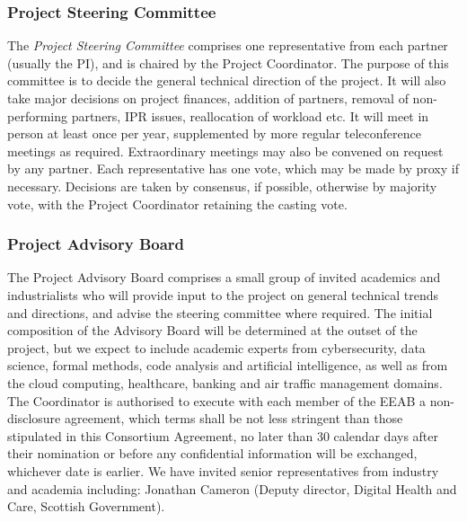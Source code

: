\documentclass[a4paper,11pt]{article}
\begin{document}
\subsubsection*{Project Steering Committee}
\vspace{-5pt}

The \emph{Project Steering Committee} comprises one representative from each partner
(usually the PI), and is chaired by the Project Coordinator.  
The purpose of this committee is to decide
the general technical direction of the project.  It will also
take major decisions on project finances, addition of partners, removal of non-performing
partners, IPR issues, reallocation of workload etc.  It will meet in person
at least once per year, supplemented by more regular teleconference
meetings as required. Extraordinary meetings may also be convened on request by any partner.
Each representative has one vote, which
may be made by proxy if necessary.  Decisions are taken by
consensus, if possible, otherwise by majority vote, with the
Project Coordinator retaining the casting vote.

\subsubsection*{Project Advisory Board}
\vspace{-5pt}

The Project Advisory Board comprises a small group of invited
academics and industrialists who will provide input to the
project on general technical trends and directions, and advise
the steering committee where required.  The initial composition
of the Advisory Board will be determined at the outset of the
project, but we expect to include academic experts from cybersecurity, data science, formal methods, code analysis and artificial intelligence, as well as from the cloud computing, healthcare, banking and air traffic management domains. The Coordinator is authorised to 
execute with each member of the EEAB a non-disclosure agreement, which 
terms shall be not less stringent than those stipulated in this 
Consortium Agreement, no later than 30 calendar days after their nomination 
or before any confidential information will be exchanged, whichever date is earlier. 
We have invited senior representatives from industry and academia including: Jonathan Cameron (Deputy director, Digital Health and Care, Scottish Government). 
\end{document}
